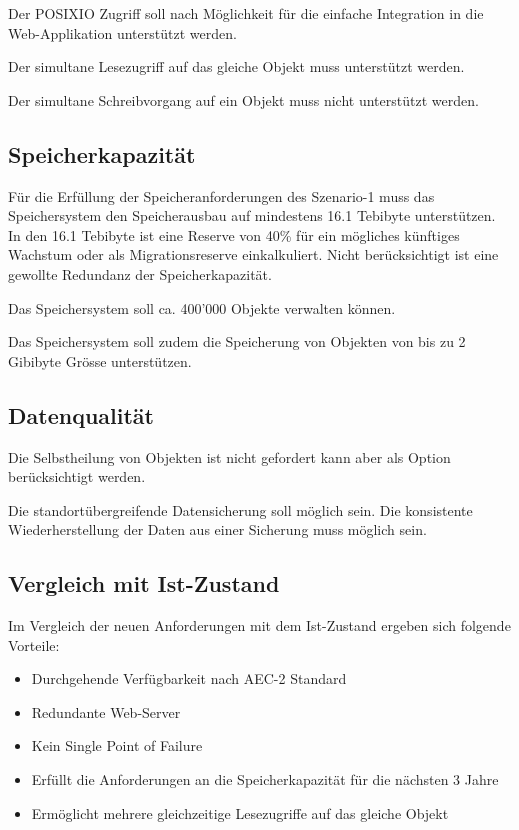Der \gls{POSIXIO} Zugriff soll nach Möglichkeit für die einfache Integration in die Web-Applikation unterstützt werden.

Der simultane Lesezugriff auf das gleiche Objekt muss unterstützt werden.

Der simultane Schreibvorgang auf ein Objekt muss nicht unterstützt werden.

\subsection{Speicherkapazität}
Für die Erfüllung der Speicheranforderungen des Szenario-1 muss das Speichersystem den Speicherausbau auf mindestens 16.1 Tebibyte unterstützen. In den 16.1 Tebibyte ist eine Reserve von 40\% für ein mögliches künftiges Wachstum oder als Migrationsreserve einkalkuliert. Nicht berücksichtigt ist eine gewollte Redundanz der Speicherkapazität.

Das Speichersystem soll ca. 400'000 Objekte verwalten können.

Das Speichersystem soll zudem die Speicherung von Objekten von bis zu 2 Gibibyte Grösse unterstützen.

\subsection{Datenqualität}

Die Selbstheilung von Objekten ist nicht gefordert kann aber als Option berücksichtigt werden.

Die standortübergreifende Datensicherung soll möglich sein.
Die konsistente Wiederherstellung der Daten aus einer Sicherung muss möglich sein. 

\subsection{Vergleich mit Ist-Zustand}
Im Vergleich der neuen Anforderungen mit dem Ist-Zustand ergeben sich folgende Vorteile:

\begin{itemize}
\item Durchgehende Verfügbarkeit nach AEC-2 Standard
\item Redundante Web-Server
\item Kein Single Point of Failure
\item Erfüllt die Anforderungen an die Speicherkapazität für die nächsten 3 Jahre
\item Ermöglicht mehrere gleichzeitige Lesezugriffe auf das gleiche Objekt
\end{itemize}

